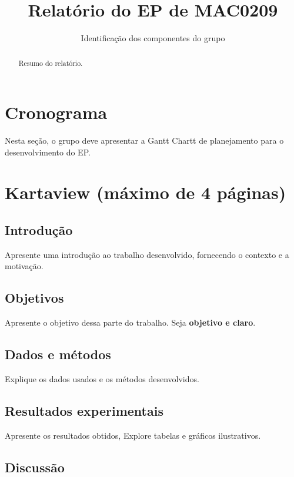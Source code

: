 \documentclass{article}
\title{Relatório do EP de MAC0209}
\author{Identificação dos componentes do grupo}
\begin{document}
\maketitle


\begin{abstract}
Resumo do relatório.
\end{abstract}

\newpage

\tableofcontents

\newpage

\section{Cronograma}

Nesta seção, o grupo deve apresentar a Gantt Chartt de planejamento para o desenvolvimento do EP.

\section{Kartaview (máximo de 4 páginas)}

\subsection{Introdução}

Apresente uma introdução ao trabalho desenvolvido, fornecendo o contexto e a motivação.

\subsection{Objetivos}

Apresente o objetivo dessa parte do trabalho. Seja {\bf objetivo e claro}.

\subsection{Dados e métodos}

Explique os dados usados e os métodos desenvolvidos.

\subsection{Resultados experimentais}

Apresente os resultados obtidos, Explore tabelas e gráficos ilustrativos.

\subsection{Discussão}
\end{document}
